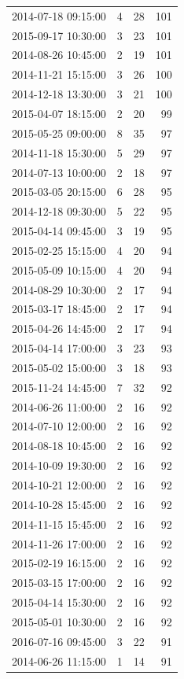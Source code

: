 \begin{tabular}{lrrr}
2014-07-18 09:15:00 & 4 & 28 & 101 \\
2015-09-17 10:30:00 & 3 & 23 & 101 \\
2014-08-26 10:45:00 & 2 & 19 & 101 \\
2014-11-21 15:15:00 & 3 & 26 & 100 \\
2014-12-18 13:30:00 & 3 & 21 & 100 \\
2015-04-07 18:15:00 & 2 & 20 & 99 \\
2015-05-25 09:00:00 & 8 & 35 & 97 \\
2014-11-18 15:30:00 & 5 & 29 & 97 \\
2014-07-13 10:00:00 & 2 & 18 & 97 \\
2015-03-05 20:15:00 & 6 & 28 & 95 \\
2014-12-18 09:30:00 & 5 & 22 & 95 \\
2015-04-14 09:45:00 & 3 & 19 & 95 \\
2015-02-25 15:15:00 & 4 & 20 & 94 \\
2015-05-09 10:15:00 & 4 & 20 & 94 \\
2014-08-29 10:30:00 & 2 & 17 & 94 \\
2015-03-17 18:45:00 & 2 & 17 & 94 \\
2015-04-26 14:45:00 & 2 & 17 & 94 \\
2015-04-14 17:00:00 & 3 & 23 & 93 \\
2015-05-02 15:00:00 & 3 & 18 & 93 \\
2015-11-24 14:45:00 & 7 & 32 & 92 \\
2014-06-26 11:00:00 & 2 & 16 & 92 \\
2014-07-10 12:00:00 & 2 & 16 & 92 \\
2014-08-18 10:45:00 & 2 & 16 & 92 \\
2014-10-09 19:30:00 & 2 & 16 & 92 \\
2014-10-21 12:00:00 & 2 & 16 & 92 \\
2014-10-28 15:45:00 & 2 & 16 & 92 \\
2014-11-15 15:45:00 & 2 & 16 & 92 \\
2014-11-26 17:00:00 & 2 & 16 & 92 \\
2015-02-19 16:15:00 & 2 & 16 & 92 \\
2015-03-15 17:00:00 & 2 & 16 & 92 \\
2015-04-14 15:30:00 & 2 & 16 & 92 \\
2015-05-01 10:30:00 & 2 & 16 & 92 \\
2016-07-16 09:45:00 & 3 & 22 & 91 \\
2014-06-26 11:15:00 & 1 & 14 & 91 \\

\end{tabular}
